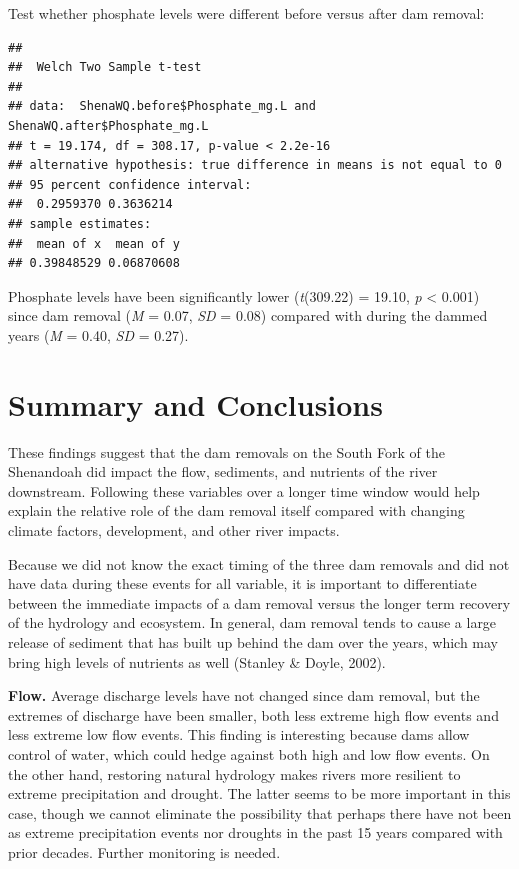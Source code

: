 \documentclass[
  12pt,
]{article}
\begin{document}
Test whether phosphate levels were different before versus after dam
removal:

\begin{verbatim}
## 
##  Welch Two Sample t-test
## 
## data:  ShenaWQ.before$Phosphate_mg.L and ShenaWQ.after$Phosphate_mg.L
## t = 19.174, df = 308.17, p-value < 2.2e-16
## alternative hypothesis: true difference in means is not equal to 0
## 95 percent confidence interval:
##  0.2959370 0.3636214
## sample estimates:
##  mean of x  mean of y 
## 0.39848529 0.06870608
\end{verbatim}

Phosphate levels have been significantly lower (\emph{t}(309.22) =
19.10, \emph{p} \textless{} 0.001) since dam removal (\emph{M} = 0.07,
\emph{SD} = 0.08) compared with during the dammed years (\emph{M} =
0.40, \emph{SD} = 0.27).

\newpage

\hypertarget{summary-and-conclusions}{%
\section{Summary and Conclusions}\label{summary-and-conclusions}}

These findings suggest that the dam removals on the South Fork of the
Shenandoah did impact the flow, sediments, and nutrients of the river
downstream. Following these variables over a longer time window would
help explain the relative role of the dam removal itself compared with
changing climate factors, development, and other river impacts.

Because we did not know the exact timing of the three dam removals and
did not have data during these events for all variable, it is important
to differentiate between the immediate impacts of a dam removal versus
the longer term recovery of the hydrology and ecosystem. In general, dam
removal tends to cause a large release of sediment that has built up
behind the dam over the years, which may bring high levels of nutrients
as well (Stanley \& Doyle, 2002).

\textbf{Flow.} Average discharge levels have not changed since dam
removal, but the extremes of discharge have been smaller, both less
extreme high flow events and less extreme low flow events. This finding
is interesting because dams allow control of water, which could hedge
against both high and low flow events. On the other hand, restoring
natural hydrology makes rivers more resilient to extreme precipitation
and drought. The latter seems to be more important in this case, though
we cannot eliminate the possibility that perhaps there have not been as
extreme precipitation events nor droughts in the past 15 years compared
with prior decades. Further monitoring is needed.
\end{document}

